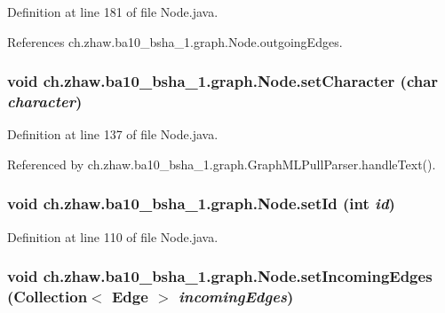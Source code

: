 Definition at line 181 of file Node.java.

References ch.zhaw.ba10\_\-bsha\_\-1.graph.Node.outgoingEdges.\hypertarget{classch_1_1zhaw_1_1ba10__bsha__1_1_1graph_1_1Node_ad1c94b7c86ad5fd14bf0aee9d52189e4}{
\subsubsection[{setCharacter}]{\setlength{\rightskip}{0pt plus 5cm}void ch.zhaw.ba10\_\-bsha\_\-1.graph.Node.setCharacter (char {\em character})}}
\label{classch_1_1zhaw_1_1ba10__bsha__1_1_1graph_1_1Node_ad1c94b7c86ad5fd14bf0aee9d52189e4}


Definition at line 137 of file Node.java.

Referenced by ch.zhaw.ba10\_\-bsha\_\-1.graph.GraphMLPullParser.handleText().\hypertarget{classch_1_1zhaw_1_1ba10__bsha__1_1_1graph_1_1Node_a2d145e592a040c0c608caf33a59e0007}{
\subsubsection[{setId}]{\setlength{\rightskip}{0pt plus 5cm}void ch.zhaw.ba10\_\-bsha\_\-1.graph.Node.setId (int {\em id})}}
\label{classch_1_1zhaw_1_1ba10__bsha__1_1_1graph_1_1Node_a2d145e592a040c0c608caf33a59e0007}


Definition at line 110 of file Node.java.\hypertarget{classch_1_1zhaw_1_1ba10__bsha__1_1_1graph_1_1Node_a18364ede156d636e492a64eeb5306d36}{
\subsubsection[{setIncomingEdges}]{\setlength{\rightskip}{0pt plus 5cm}void ch.zhaw.ba10\_\-bsha\_\-1.graph.Node.setIncomingEdges (Collection$<$ {\bf Edge} $>$ {\em incomingEdges})}}
\label{classch_1_1zhaw_1_1ba10__bsha__1_1_1graph_1_1Node_a18364ede156d636e492a64eeb5306d36}


